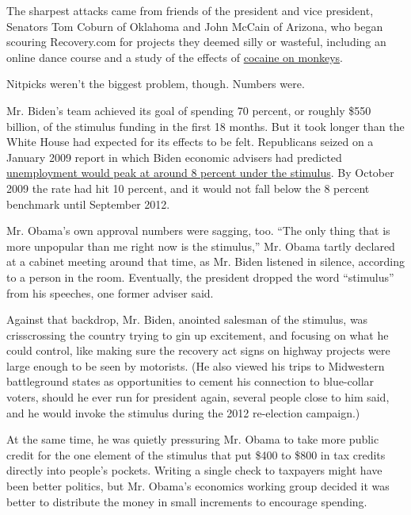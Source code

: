 The sharpest attacks came from friends of the president and vice
president, Senators Tom Coburn of Oklahoma and John McCain of Arizona,
who began scouring Recovery.com for projects they deemed silly or
wasteful, including an online dance course and a study of the effects of
\href{https://edition.cnn.com/2010/POLITICS/08/03/senators.stimulus.spending.hfr/?hpt=Sbin\#fbid=ArbgvoCEUuW}{cocaine
on monkeys}.

Nitpicks weren't the biggest problem, though. Numbers were.

Mr. Biden's team achieved its goal of spending 70 percent, or roughly
\$550 billion, of the stimulus funding in the first 18 months. But it
took longer than the White House had expected for its effects to be
felt. Republicans seized on a January 2009 report in which Biden
economic advisers had predicted
\href{https://www.politifact.com/factchecks/2010/jul/13/george-will/will-obama-said-stimulus-would-cap-unemployment-8-/}{unemployment
would peak at around 8 percent under the stimulus}. By October 2009 the
rate had hit 10 percent, and it would not fall below the 8 percent
benchmark until September 2012.

Mr. Obama's own approval numbers were sagging, too. ``The only thing
that is more unpopular than me right now is the stimulus,'' Mr. Obama
tartly declared at a cabinet meeting around that time, as Mr. Biden
listened in silence, according to a person in the room. Eventually, the
president dropped the word ``stimulus'' from his speeches, one former
adviser said.

Against that backdrop, Mr. Biden, anointed salesman of the stimulus, was
crisscrossing the country trying to gin up excitement, and focusing on
what he could control, like making sure the recovery act signs on
highway projects were large enough to be seen by motorists. (He also
viewed his trips to Midwestern battleground states as opportunities to
cement his connection to blue-collar voters, should he ever run for
president again, several people close to him said, and he would invoke
the stimulus during the 2012 re-election campaign.)

At the same time, he was quietly pressuring Mr. Obama to take more
public credit for the one element of the stimulus that put \$400 to
\$800 in tax credits directly into people's pockets. Writing a single
check to taxpayers might have been better politics, but Mr. Obama's
economics working group decided it was better to distribute the money in
small increments to encourage spending.

